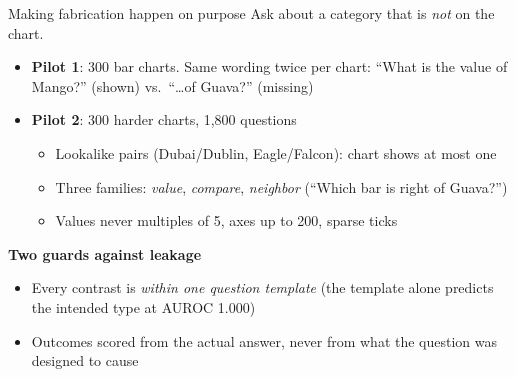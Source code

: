 \documentclass[10pt,aspectratio=169]{beamer}
\begin{document}
\begin{frame}{Making fabrication happen on purpose}
Ask about a category that is \emph{not} on the chart.
\begin{itemize}
\item \textbf{Pilot 1}: 300 bar charts. Same wording twice per chart: ``What is
the value of Mango?'' (shown) vs.\ ``\dots of Guava?'' (missing)
\item \textbf{Pilot 2}: 300 harder charts, 1,800 questions
\begin{itemize}
\item Lookalike pairs (Dubai/Dublin, Eagle/Falcon): chart shows at most one
\item Three families: \emph{value}, \emph{compare}, \emph{neighbor}
(``Which bar is right of Guava?'')
\item Values never multiples of 5, axes up to 200, sparse ticks
\end{itemize}
\end{itemize}
\textbf{Two guards against leakage}
\begin{itemize}
\item Every contrast is \emph{within one question template} (the template alone
predicts the intended type at AUROC 1.000)
\item Outcomes scored from the actual answer, never from what the question was
designed to cause
\end{itemize}
\end{frame}
\end{document}
